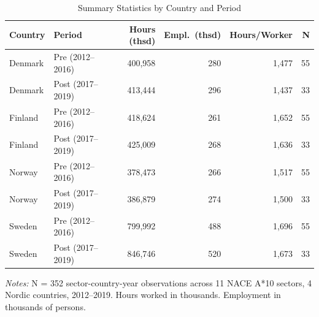 \begin{table}[H]
\centering
\caption{Summary Statistics by Country and Period}
\label{tab:summary}
\small
\begin{threeparttable}
\begin{tabular}{llrrrr}
\toprule
Country & Period & Hours (thsd) & Empl.\ (thsd) & Hours/Worker & N \\
\midrule
Denmark & Pre (2012--2016) & 400,958 & 280 & 1,477 & 55 \\
Denmark & Post (2017--2019) & 413,444 & 296 & 1,437 & 33 \\
Finland & Pre (2012--2016) & 418,624 & 261 & 1,652 & 55 \\
Finland & Post (2017--2019) & 425,009 & 268 & 1,636 & 33 \\
Norway & Pre (2012--2016) & 378,473 & 266 & 1,517 & 55 \\
Norway & Post (2017--2019) & 386,879 & 274 & 1,500 & 33 \\
Sweden & Pre (2012--2016) & 799,992 & 488 & 1,696 & 55 \\
Sweden & Post (2017--2019) & 846,746 & 520 & 1,673 & 33 \\
\bottomrule
\end{tabular}
\begin{tablenotes}[flushleft]
\footnotesize
\item \textit{Notes:} N = 352 sector-country-year observations across 11 NACE A*10 sectors, 4 Nordic countries, 2012--2019. Hours worked in thousands. Employment in thousands of persons.
\end{tablenotes}
\end{threeparttable}
\end{table}

